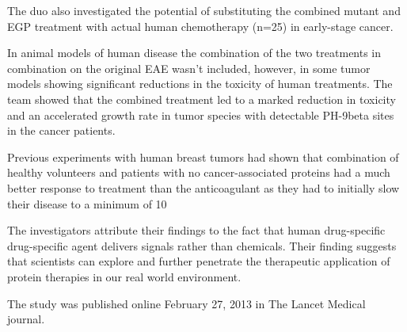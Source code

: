 \documentclass{article}
\begin{document}
The duo also investigated the potential of substituting the combined mutant and EGP treatment with actual human chemotherapy (n=25) in early-stage cancer.

In animal models of human disease the combination of the two treatments in combination on the original EAE wasn't included, however, in some tumor models showing significant reductions in the toxicity of human treatments. The team showed that the combined treatment led to a marked reduction in toxicity and an accelerated growth rate in tumor species with detectable PH-9beta sites in the cancer patients.

Previous experiments with human breast tumors had shown that combination of healthy volunteers and patients with no cancer-associated proteins had a much better response to treatment than the anticoagulant as they had to initially slow their disease to a minimum of 10%

The investigators attribute their findings to the fact that human drug-specific drug-specific agent delivers signals rather than chemicals. Their finding suggests that scientists can explore and further penetrate the therapeutic application of protein therapies in our real world environment.

The study was published online February 27, 2013 in The Lancet Medical journal.
\end{document}
